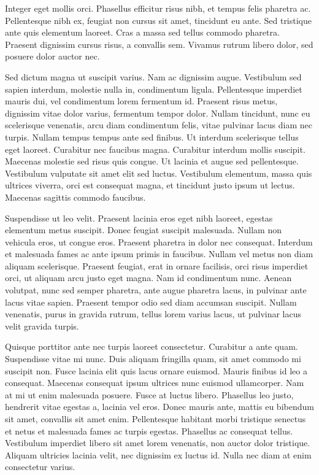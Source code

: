 \documentclass[titlepage]{article}
\begin{document}
Integer eget mollis orci. Phasellus efficitur risus nibh, et tempus felis pharetra ac. Pellentesque nibh ex, feugiat non cursus sit amet, tincidunt eu ante. Sed tristique ante quis elementum laoreet. Cras a massa sed tellus commodo pharetra. Praesent dignissim cursus risus, a convallis sem. Vivamus rutrum libero dolor, sed posuere dolor auctor nec.

Sed dictum magna ut suscipit varius. Nam ac dignissim augue. Vestibulum sed sapien interdum, molestie nulla in, condimentum ligula. Pellentesque imperdiet mauris dui, vel condimentum lorem fermentum id. Praesent risus metus, dignissim vitae dolor varius, fermentum tempor dolor. Nullam tincidunt, nunc eu scelerisque venenatis, arcu diam condimentum felis, vitae pulvinar lacus diam nec turpis. Nullam tempus tempus ante sed finibus. Ut interdum scelerisque tellus eget laoreet. Curabitur nec faucibus magna. Curabitur interdum mollis suscipit. Maecenas molestie sed risus quis congue. Ut lacinia et augue sed pellentesque. Vestibulum vulputate sit amet elit sed luctus. Vestibulum elementum, massa quis ultrices viverra, orci est consequat magna, et tincidunt justo ipsum ut lectus. Maecenas sagittis commodo faucibus.

Suspendisse ut leo velit. Praesent lacinia eros eget nibh laoreet, egestas elementum metus suscipit. Donec feugiat suscipit malesuada. Nullam non vehicula eros, ut congue eros. Praesent pharetra in dolor nec consequat. Interdum et malesuada fames ac ante ipsum primis in faucibus. Nullam vel metus non diam aliquam scelerisque. Praesent feugiat, erat in ornare facilisis, orci risus imperdiet orci, ut aliquam arcu justo eget magna. Nam id condimentum nunc. Aenean volutpat, nunc sed semper pharetra, ante augue pharetra lacus, in pulvinar ante lacus vitae sapien. Praesent tempor odio sed diam accumsan suscipit. Nullam venenatis, purus in gravida rutrum, tellus lorem varius lacus, ut pulvinar lacus velit gravida turpis.

Quisque porttitor ante nec turpis laoreet consectetur. Curabitur a ante quam. Suspendisse vitae mi nunc. Duis aliquam fringilla quam, sit amet commodo mi suscipit non. Fusce lacinia elit quis lacus ornare euismod. Mauris finibus id leo a consequat. Maecenas consequat ipsum ultrices nunc euismod ullamcorper. Nam at mi ut enim malesuada posuere. Fusce at luctus libero. Phasellus leo justo, hendrerit vitae egestas a, lacinia vel eros. Donec mauris ante, mattis eu bibendum sit amet, convallis sit amet enim. Pellentesque habitant morbi tristique senectus et netus et malesuada fames ac turpis egestas. Phasellus ac consequat tellus. Vestibulum imperdiet libero sit amet lorem venenatis, non auctor dolor tristique. Aliquam ultricies lacinia velit, nec dignissim ex luctus id. Nulla nec diam at enim consectetur varius.
\end{document}
